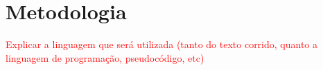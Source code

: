 
\chapter{Metodologia}
\label{chap:metodo}
\textcolor{red}{Explicar a linguagem que será utilizada (tanto do texto corrido, quanto a linguagem de programação, pseudocódigo, etc)}

